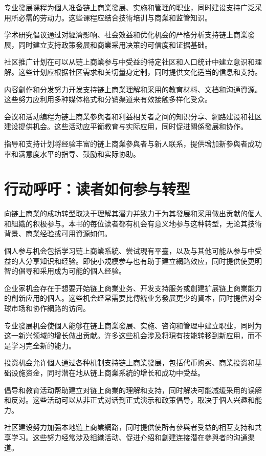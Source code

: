 \documentclass[
  Letterpaper,
]{scrbook}
\begin{document}
专业發展课程为個人准备链上商業發展、实施和管理的职业，同时建设支持广泛采用所必需的劳动力。这些课程应结合技術培训与商業和监管知识。

学术研究倡议通过对經濟影响、社会效益和优化机会的严格分析支持链上商業發展，同时建立支持政策發展和商業采用决策的可信度和证据基础。

社区推广计划在可以从链上商業参与中受益的特定社区和人口统计中建立意识和理解。这些计划应根据社区需求和关切量身定制，同时提供文化适当的信息和支持。

内容創作和分发努力开发支持链上商業理解和采用的教育材料、文档和沟通資源。这些努力应利用多种媒体格式和分销渠道来有效接触多样化受众。

会议和活动编程为链上商業參與者和利益相关者之间的知识分享、網路建设和社区建设提供机会。这些活动应平衡教育与实际应用，同时促进關係發展和协作。

指导和支持计划将经验丰富的链上商業參與者与新人联系，提供增加新參與者成功率和满意度水平的指导、鼓励和实际协助。

\section{行动呼吁：读者如何参与转型}\label{ux884cux52a8ux547cux5401ux8bfbux8005ux5982ux4f55ux53c2ux4e0eux8f6cux578b}

向链上商業的成功转型取决于理解其潜力并致力于为其發展和采用做出贡献的個人和組織的积极参与。本书的每位读者都有机会有意义地参与这种转型，无论其技術背景、商業经验或可用資源如何。

個人参与机会包括学习链上商業系統、尝试現有平臺，以及与其他可能从参与中受益的人分享知识和经验。即使小規模参与也有助于建立網路效应，同时提供使更明智的倡导和采用成为可能的個人经验。

企业家机会存在于想要开始链上商業业务、开发支持服务或創建扩展链上商業能力的創新应用的個人。这些机会经常需要比傳統业务發展更少的資本，同时提供对全球市场和协作網路的访问。

专业發展机会使個人能够在链上商業發展、实施、咨询和管理中建立职业，同时为这一新兴领域的增长做出贡献。许多这些机会涉及将現有技能转移到新应用，而不是学习完全新的能力。

投资机会允许個人通过各种机制支持链上商業發展，包括代币购买、商業投资和基础设施资金，同时潜在地从链上商業系統的增长和成功中受益。

倡导和教育活动帮助建立对链上商業的理解和支持，同时解决可能减缓采用的误解和反对。这些活动可以从非正式对话到正式演示和政策倡导，取决于個人兴趣和能力。

社区建设努力加强本地链上商業網路，同时提供使所有參與者受益的相互支持和共享学习。这些努力经常涉及組織活动、促进介绍和創建连接潜在參與者的沟通渠道。
\end{document}
